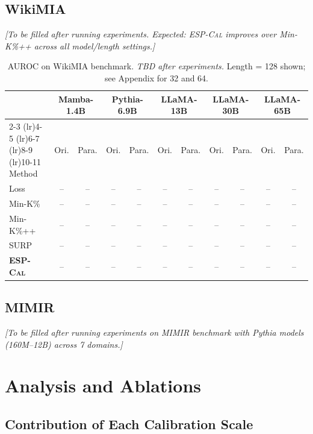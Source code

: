 \documentclass[11pt]{article}
\newcommand{\ours}{\textsc{ESP-Cal}}
\begin{document}
\subsection{WikiMIA}

\textit{[To be filled after running experiments. Expected: \ours{} improves over Min-K\%++ across all model/length settings.]}

\begin{table}[t]
\centering
\small
\begin{tabular}{@{}l*{5}{cc}@{}}
\toprule
& \multicolumn{2}{c}{Mamba-1.4B} & \multicolumn{2}{c}{Pythia-6.9B} & \multicolumn{2}{c}{LLaMA-13B} & \multicolumn{2}{c}{LLaMA-30B} & \multicolumn{2}{c}{LLaMA-65B} \\
\cmidrule(lr){2-3} \cmidrule(lr){4-5} \cmidrule(lr){6-7} \cmidrule(lr){8-9} \cmidrule(lr){10-11}
Method & Ori. & Para. & Ori. & Para. & Ori. & Para. & Ori. & Para. & Ori. & Para. \\
\midrule
Loss & -- & -- & -- & -- & -- & -- & -- & -- & -- & -- \\
Min-K\% & -- & -- & -- & -- & -- & -- & -- & -- & -- & -- \\
Min-K\%++ & -- & -- & -- & -- & -- & -- & -- & -- & -- & -- \\
SURP & -- & -- & -- & -- & -- & -- & -- & -- & -- & -- \\
\textbf{\ours{}} & -- & -- & -- & -- & -- & -- & -- & -- & -- & -- \\
\bottomrule
\end{tabular}
\caption{AUROC on WikiMIA benchmark. \textit{TBD after experiments.} Length = 128 shown; see Appendix for 32 and 64.}
\label{tab:wikimia}
\end{table}

\subsection{MIMIR}

\textit{[To be filled after running experiments on MIMIR benchmark with Pythia models (160M--12B) across 7 domains.]}

\section{Analysis and Ablations}
\label{sec:ablation}

\subsection{Contribution of Each Calibration Scale}
\end{document}
